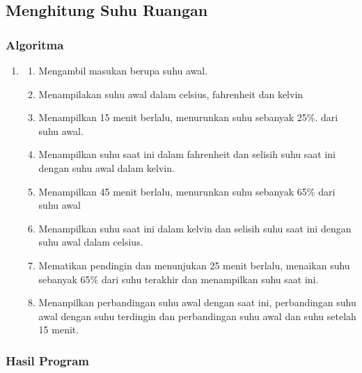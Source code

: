 \documentclass[../main.tex]{subfiles}
\begin{document}
\subsection{Menghitung Suhu Ruangan}
\subsubsection{Algoritma}
\begin{enumerate}
    \item []
    \begin{enumerate}
        \item {Mengambil masukan berupa suhu awal.}
        \item {Menampilakan suhu awal dalam celsius, fahrenheit dan kelvin}
        \item {Menampilkan 15 menit berlalu, menurunkan suhu sebanyak 25\%. dari suhu awal.}
        \item {Menampilkan suhu saat ini dalam fahrenheit dan selisih suhu saat ini dengan suhu awal dalam kelvin.}
        \item {Menampilkan 45 menit berlalu, menurunkan suhu sebanyak 65\% dari suhu awal}
        \item {Menampilkan suhu saat ini dalam kelvin dan selisih suhu saat ini dengan suhu awal dalam celsius.}
        \item {Mematikan pendingin dan menunjukan 25 menit berlalu, menaikan suhu sebanyak 65\% dari suhu terakhir dan menampilkan suhu saat ini.}
        \item {Menanpilkan perbandingan suhu awal dengan saat ini, perbandingan suhu awal dengan suhu terdingin dan perbandingan suhu awal dan suhu setelah 15 menit.}
    \end{enumerate}
\end{enumerate}

\subsubsection{{\Pseudocode}}
\newpage
\subsubsectionf{{\Flowchart}}
\vspace{0.5ex}

\subsubsection{{\Source} {\sCode}}

\subsubsection{Hasil Program}
\end{document}
